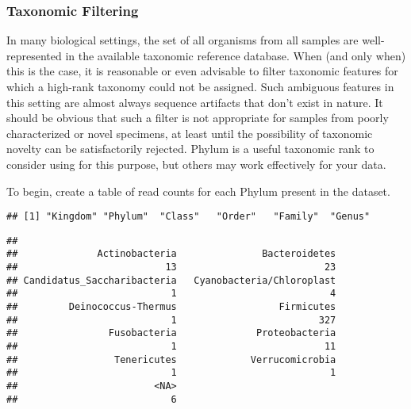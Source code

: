 \subsubsection*{Taxonomic Filtering}

In many biological settings, the set of all organisms from all samples are well-represented in the available taxonomic reference database.
When (and only when) this is the case, it is reasonable or even advisable to filter taxonomic features
for which a high-rank taxonomy could not be assigned.
Such ambiguous features in this setting are almost always sequence artifacts that don't exist in nature.
It should be obvious that such a filter is not appropriate for samples from poorly characterized or novel specimens, at least until the possibility of taxonomic novelty can be satisfactorily rejected.
Phylum is a useful taxonomic rank to consider using for this purpose, but others may work effectively for your data.

To begin, create a table of read counts for each Phylum present in the dataset.

\begin{knitrout}
\color{fgcolor}\begin{kframe}
\begin{alltt}
\end{alltt}
\begin{verbatim}
## [1] "Kingdom" "Phylum"  "Class"   "Order"   "Family"  "Genus"
\end{verbatim}
\begin{alltt}
\hlstd{(}\hlstd{(ps)[,} \hlstd{],}  \hlstd{=} \hlstd{)}
\end{alltt}
\begin{verbatim}
## 
##              Actinobacteria               Bacteroidetes 
##                          13                          23 
## Candidatus_Saccharibacteria   Cyanobacteria/Chloroplast 
##                           1                           4 
##         Deinococcus-Thermus                  Firmicutes 
##                           1                         327 
##                Fusobacteria              Proteobacteria 
##                           1                          11 
##                 Tenericutes             Verrucomicrobia 
##                           1                           1 
##                        <NA> 
##                           6
\end{verbatim}
\end{kframe}
\end{knitrout}

